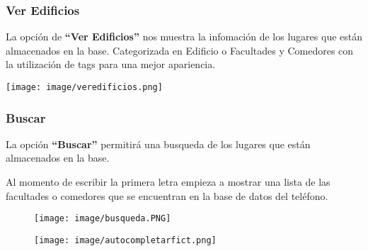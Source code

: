 \documentclass[a4paper,11pt]{article}
\begin{document}
	
	
	\subsubsection{Ver Edificios}
	
		La opci\'{o}n de \textbf{``Ver Edificios''} nos muestra la infomaci\'{o}n de los lugares que est\'{a}n almacenados en la base.
		\newline
		\newline
		Categorizada en Edificio o Facultades y Comedores con la utilizaci\'{o}n de tags para una mejor apariencia.
		
		\begin{center}
			\texttt{[image: image/veredificios.png]}
		\end{center}
	
	
		
\newpage

\subsubsection{Buscar}

			 La opci\'{o}n \textbf{``Buscar''} permitir\'{a} una busqueda de los lugares que est\'{a}n almacenados en la base.
			
			Al momento de escribir la primera letra empieza a mostrar una lista de las facultades o comedores que se encuentran en la base de datos del tel\'{e}fono.
			\newline
		
		
		
		\begin{figure}[h] %
		\hfill
			\begin{minipage}[t]{.45\textwidth}
				\begin{center}
					\texttt{[image: image/busqueda.PNG]} 
				\end{center}
			\end{minipage}
			\hfill
			\begin{minipage}[t]{.45\textwidth}
				\begin{center}
					\texttt{[image: image/autocompletarfict.png]} 
				\end{center}
			\end{minipage}
		\hfill
		\end{figure}
\end{document}
